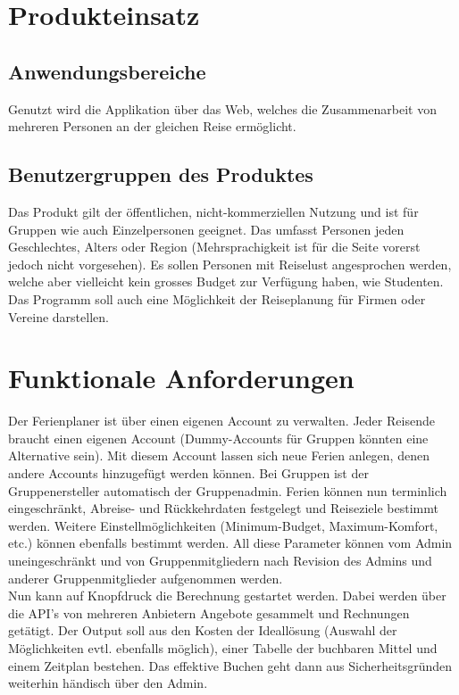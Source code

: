 \documentclass[10pt,a4paper,titlepage,twoside,german,final]{zhawreprt}
\numberwithin{table}{chapter}
\begin{document}
\chapter{Produkteinsatz}\label{chp:ProductApplication}
\section{Anwendungsbereiche}\label{sec:FieldOfApplience}
Genutzt wird die Applikation über das Web, welches die Zusammenarbeit von mehreren Personen an der gleichen Reise ermöglicht.
\section{Benutzergruppen des Produktes}\label{sec:TargetAudience}
Das Produkt gilt der öffentlichen, nicht-kommerziellen Nutzung und ist für Gruppen wie auch Einzelpersonen geeignet. Das umfasst Personen jeden Geschlechtes, Alters oder Region (Mehrsprachigkeit ist für die Seite vorerst jedoch nicht vorgesehen). Es sollen Personen mit Reiselust angesprochen werden, welche aber vielleicht kein grosses Budget zur Verfügung haben, wie Studenten. Das Programm soll auch eine Möglichkeit der Reiseplanung für Firmen oder Vereine darstellen.
\chapter{Funktionale Anforderungen}\label{chp:FunctionalRequirements}
Der Ferienplaner ist über einen eigenen Account zu verwalten. Jeder Reisende braucht einen eigenen Account (Dummy-Accounts für Gruppen könnten eine Alternative sein). Mit diesem Account lassen sich neue Ferien anlegen, denen andere Accounts hinzugefügt werden können. Bei Gruppen ist der Gruppenersteller automatisch der Gruppenadmin. Ferien können nun terminlich eingeschränkt, Abreise- und Rückkehrdaten festgelegt und Reiseziele bestimmt werden. Weitere Einstellmöglichkeiten (Minimum-Budget, Maximum-Komfort, etc.) können ebenfalls bestimmt werden. All diese Parameter können vom Admin uneingeschränkt und von Gruppenmitgliedern nach Revision des Admins und anderer Gruppenmitglieder aufgenommen werden.\\
Nun kann auf Knopfdruck die Berechnung gestartet werden. Dabei werden über die API's von mehreren Anbietern Angebote gesammelt und Rechnungen getätigt. Der Output soll aus den Kosten der Ideallösung (Auswahl der Möglichkeiten evtl. ebenfalls möglich), einer Tabelle der buchbaren Mittel und einem Zeitplan bestehen. Das effektive Buchen geht dann aus Sicherheitsgründen weiterhin händisch über den Admin.
\end{document}
